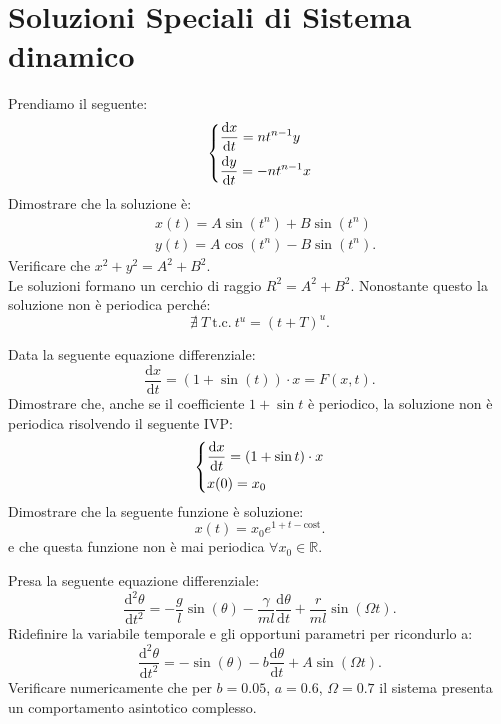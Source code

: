 \section{Soluzioni Speciali di Sistema dinamico}%
\begin{ex}
    Prendiamo il seguente:
    \[
        \begin{dcases}
            \frac{\text{d} x}{\text{d} t} = nt^{n-1}y\\
	    \frac{\text{d} y}{\text{d} t}  = -nt^{n-1}x
        \end{dcases}
    \] 
    Dimostrare che la soluzione è:
    \[\begin{aligned}
	&x(t) = A\sin (t^n) + B\sin (t^n)\\
	&y(t) = A\cos (t^n) - B\sin (t^n)
    .\end{aligned}\]
    Verificare che $x^2+y^2 = A^2+B^2$.\\
    Le soluzioni formano un cerchio di raggio $R^2 = A^2+B^2$. Nonostante questo la soluzione non è periodica perché:
    \[
	\nexists \ T \ \text{t.c.} \ t^{u} = (t + T)^u
    .\] 
\end{ex}
\noindent
\begin{ex}
    Data la seguente equazione differenziale:
    \[
	\frac{\text{d} x}{\text{d} t} = (1+\sin (t))\cdot x = F(x,t)
    .\] 
    Dimostrare che, anche se il coefficiente $1+\sin t$ è periodico, la soluzione non è periodica risolvendo il seguente IVP:
    \[
        \begin{dcases}
	    \frac{\text{d} x}{\text{d} t} = (1+\sin t)\cdot x\\
	    x(0) = x_0
        \end{dcases}
    \] 
    Dimostrare che la seguente funzione è soluzione:
    \[
	x(t) = x_0e^{1+t-\text{cost}}
    .\] 
    e che questa funzione non è mai periodica $\forall x_0 \in \mathbb{R}$.
\end{ex}
\noindent
\begin{ex}
    Presa la seguente equazione differenziale:
    \[
	\frac{\text{d} ^2\theta}{\text{d} t^2} = - \frac{g}{l}\sin (\theta) - \frac{\gamma}{ml}\frac{\text{d} \theta}{\text{d} t} + \frac{r}{ml}\sin (\Omega  t)
    .\] 
    Ridefinire la variabile temporale e gli opportuni parametri per ricondurlo a:
    \[
	\frac{\text{d} ^2\theta}{\text{d} t^2} = - \sin (\theta) - b \frac{\text{d} \theta}{\text{d} t} + A\sin (\Omega  t)
    .\] 
    Verificare numericamente che per $b=0.05$, $a = 0.6$, $\Omega  = 0.7$ il sistema presenta un comportamento asintotico complesso.
\end{ex}

